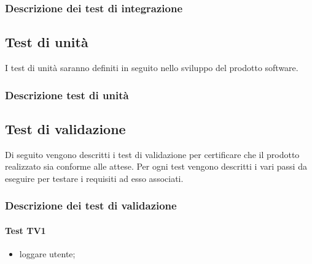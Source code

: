 \subsubsection{Descrizione dei test di integrazione}
\subsection{Test di unità}
I test di unità saranno definiti in seguito nello sviluppo del prodotto software.
\subsubsection{Descrizione test di unità}%
\subsection{Test di validazione}%
Di seguito vengono descritti i test di validazione per certificare che il prodotto realizzato sia conforme alle attese. Per ogni test vengono descritti i vari passi da eseguire per testare i requisiti ad esso associati.
\subsubsection{Descrizione dei test di validazione}
\paragraph{Test TV1}
\begin{itemize}
\item loggare utente;
\end{itemize}

